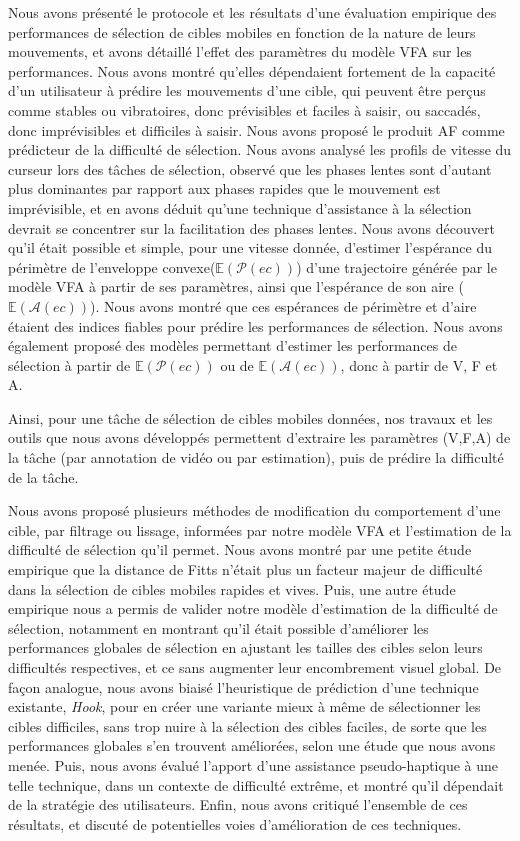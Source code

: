 	Nous avons présenté le protocole et les résultats d'une évaluation empirique des performances de sélection de cibles mobiles en fonction de la nature de leurs mouvements, et avons détaillé l'effet des paramètres du modèle VFA sur les performances. Nous avons montré qu'elles dépendaient fortement de la capacité d'un utilisateur à prédire les mouvements d'une cible, qui peuvent être perçus comme stables ou vibratoires, donc prévisibles et faciles à saisir, ou saccadés, donc imprévisibles et difficiles à saisir. Nous avons proposé le produit AF comme prédicteur de la difficulté de sélection. Nous avons analysé les profils de vitesse du curseur lors des tâches de sélection, observé que les phases lentes sont d'autant plus dominantes par rapport aux phases rapides que le mouvement est imprévisible, et en avons déduit qu'une technique d'assistance à la sélection devrait se concentrer sur la facilitation des phases lentes. Nous avons découvert qu'il était possible et simple, pour une vitesse donnée, d'estimer l'espérance du périmètre de l'enveloppe convexe($\mathbb{E}(\mathcal{P}(ec))$) d'une trajectoire générée par le modèle VFA à partir de ses paramètres, ainsi que l'espérance de son aire ($\mathbb{E}(\mathcal{A}(ec))$). Nous avons montré que ces espérances de périmètre et d'aire étaient des indices fiables pour prédire les performances de sélection. Nous avons également proposé des modèles permettant d'estimer les performances de sélection à partir de $\mathbb{E}(\mathcal{P}(ec))$ ou de $\mathbb{E}(\mathcal{A}(ec))$, donc à partir de V, F et A.
	
	Ainsi, pour une tâche de sélection de cibles mobiles données, nos travaux et les outils que nous avons développés permettent d'extraire les paramètres (V,F,A) de la tâche (par annotation de vidéo ou par estimation), puis de prédire la difficulté de la tâche.
	
	Nous avons proposé plusieurs méthodes de modification du comportement d'une cible, par filtrage ou lissage, informées par notre modèle VFA et l'estimation de la difficulté de sélection qu'il permet. Nous avons montré par une petite étude empirique que la distance de Fitts n'était plus un facteur majeur de difficulté dans la sélection de cibles mobiles rapides et vives. Puis, une autre étude empirique nous a permis de valider notre modèle d'estimation de la difficulté de sélection, notamment en montrant qu'il était possible d'améliorer les performances globales de sélection en ajustant les tailles des cibles selon leurs difficultés respectives, et ce sans augmenter leur encombrement visuel global. De façon analogue, nous avons biaisé l'heuristique de prédiction d'une technique existante, \emph{Hook}, pour en créer une variante mieux à même de sélectionner les cibles difficiles, sans trop nuire à la sélection des cibles faciles, de sorte que les performances globales s'en trouvent améliorées, selon une étude que nous avons menée. Puis, nous avons évalué l'apport d'une assistance pseudo-haptique à une telle technique, dans un contexte de difficulté extrême, et montré qu'il dépendait de la stratégie des utilisateurs. Enfin, nous avons critiqué l'ensemble de ces résultats, et discuté de potentielles voies d'amélioration de ces techniques.
	

